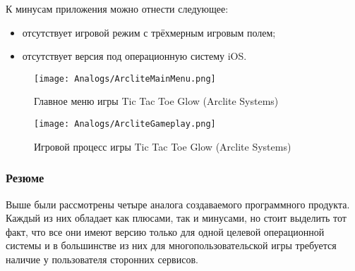 К минусам приложения можно отнести следующее:
\begin{itemize}
    \item отсутствует игровой режим с трёхмерным игровым полем;
    \item отсутствует версия под операционную систему iOS.
\end{itemize}

\begin{figure}
    \centering
    \texttt{[image: Analogs/ArcliteMainMenu.png]}
    \caption{Главное меню игры Tic Tac Toe Glow (Arclite Systems)}
    \label{Figure:Analysis:ArcliteMainMenu}
\end{figure}

\begin{figure}
    \centering
    \texttt{[image: Analogs/ArcliteGameplay.png]}
    \caption{Игровой процесс игры Tic Tac Toe Glow (Arclite Systems)}
    \label{Figure:Analysis:ArcliteGameplay}
\end{figure}


\subsubsection{Резюме}

Выше были рассмотрены четыре аналога создаваемого программного продукта. Каждый из них обладает как плюсами, так и минусами, но стоит выделить тот факт, что все они имеют версию только для одной целевой операционной системы и в большинстве из них для многопользовательской игры требуется наличие у пользователя сторонних сервисов.